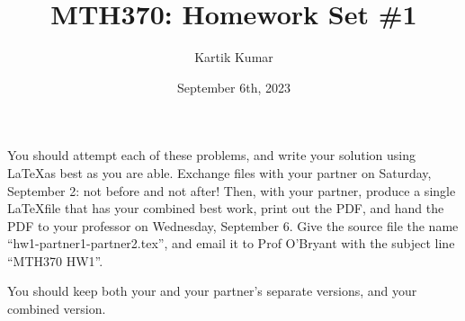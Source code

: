 \documentclass[10pt]{article}
\theoremstyle{definition}
\begin{document}
\title{MTH370: Homework Set \#1}
\author{Kartik Kumar}
\date{September 6th, 2023}
\maketitle

You should attempt each of these problems, and write your solution using \LaTeX as best as you are able. Exchange files with your partner on Saturday, September 2: not before and not after! Then, with your partner, produce a single \LaTeX file that has your combined best work, print out the PDF, and hand the PDF to your professor on Wednesday, September 6. Give the source file the name ``hw1-partner1-partner2.tex'', and email it to Prof O'Bryant with the subject line ``MTH370 HW1''.

You should keep both your and your partner's separate versions, and your combined version.
\end{document}
